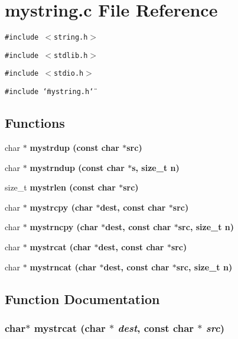 \section{mystring.c File Reference}
\label{mystring_8c}
{\tt \#include $<$string.h$>$}\par
{\tt \#include $<$stdlib.h$>$}\par
{\tt \#include $<$stdio.h$>$}\par
{\tt \#include \char`\"{}mystring.h\char`\"{}}\par
\subsection*{Functions}
\begin{CompactItemize}
\item 
char $\ast$ \bf{mystrdup} (const char $\ast$src)
\item 
char $\ast$ \bf{mystrndup} (const char $\ast$s, size\_\-t n)
\item 
size\_\-t \bf{mystrlen} (const char $\ast$src)
\item 
char $\ast$ \bf{mystrcpy} (char $\ast$dest, const char $\ast$src)
\item 
char $\ast$ \bf{mystrncpy} (char $\ast$dest, const char $\ast$src, size\_\-t n)
\item 
char $\ast$ \bf{mystrcat} (char $\ast$dest, const char $\ast$src)
\item 
char $\ast$ \bf{mystrncat} (char $\ast$dest, const char $\ast$src, size\_\-t n)
\end{CompactItemize}


\subsection{Function Documentation}
\subsubsection{\setlength{\rightskip}{0pt plus 5cm}char$\ast$ mystrcat (char $\ast$ {\em dest}, const char $\ast$ {\em src})}\label{mystring_8c_ebc286ca79fc1f0b7ca5d05066cd79a7}


